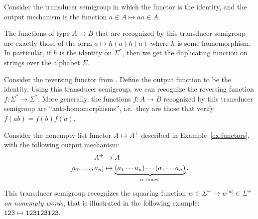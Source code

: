 \begin{example}\label{ex:duplicator}
    Consider the transducer semigroup in which the functor is the identity, and the output mechanism is the function $a \in A \mapsto aa \in A$.

    The functions of type $A \to B$ that are recognized by this transducer semigroup are exactly those of the form $a \mapsto h(a)h(a)$ where $h$ is some homomorphism. In particular, if $h$ is the identity on $\Sigma^*$, then we get the duplicating function on strings over the alphabet $\Sigma$.
\end{example}



\begin{example}
    Consider the reversing functor from . Define the output function to be the identity. Using this transducer semigroup, we can recognize the reversing function $f : \Sigma^* \to \Sigma^*$. More generally, the functions $f : A \to B$ recognized by this transducer semigroup are \enquote{anti-homomorphisms}, i.e.\ they are those that verify $f(ab) = f(b)f(a)$.
\end{example}

\begin{example}\label{ex:squaring}
    Consider the nonempty list functor $A \mapsto A^+$ described in Example~\ref{ex:functors}, with the following output mechanism:
    \begin{align*}
    A^+ & \to A\\
    [a_1,\ldots,a_n] & \mapsto \myunderbrace{(a_1 \cdots a_n) \cdots (a_1 \cdots a_n)}{$n$ times}.
    \end{align*}
    This transducer semigroup recognizes the squaring function $w \in \Sigma^+ \mapsto w^{|w|} \in \Sigma^+$ \emph{on nonempty words}, that is illustrated in the following example: $\mathtt{123 \mapsto 123123123}$.
\end{example}

